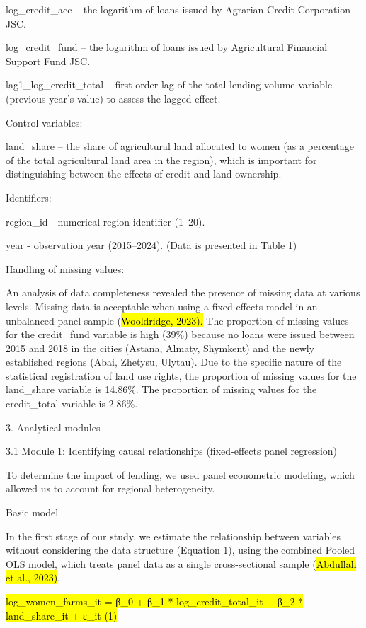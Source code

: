\documentclass[
]{article}
\begin{document}
log\_credit\_acc -- the logarithm of loans issued by Agrarian Credit
Corporation JSC.

log\_credit\_fund -- the logarithm of loans issued by Agricultural
Financial Support Fund JSC.

lag1\_log\_credit\_total -- first-order lag of the total lending volume
variable (previous year's value) to assess the lagged effect.

Control variables:

land\_share -- the share of agricultural land allocated to women (as a
percentage of the total agricultural land area in the region), which is
important for distinguishing between the effects of credit and land
ownership.

Identifiers:

region\_id - numerical region identifier (1--20).

year - observation year (2015--2024). (Data is presented in Table 1)

Handling of missing values:

An analysis of data completeness revealed the presence of missing data
at various levels. Missing data is acceptable when using a fixed-effects
model in an unbalanced panel sample (\hl{Wooldridge, 2023).} The
proportion of missing values for the credit\_fund variable is high
(39\%) because no loans were issued between 2015 and 2018 in the cities
(Astana, Almaty, Shymkent) and the newly established regions (Abai,
Zhetysu, Ulytau). Due to the specific nature of the statistical
registration of land use rights, the proportion of missing values for
the land\_share variable is 14.86\%. The proportion of missing values
for the credit\_total variable is 2.86\%.

3. Analytical modules

3.1 Module 1: Identifying causal relationships (fixed-effects panel
regression)

To determine the impact of lending, we used panel econometric modeling,
which allowed us to account for regional heterogeneity.

Basic model

In the first stage of our study, we estimate the relationship between
variables without considering the data structure (Equation 1), using the
combined Pooled OLS model, which treats panel data as a single
cross-sectional sample (\hl{Abdullah et al., 2023)}.

\hl{log\_women\_farms\_it = β\_0 + β\_1 * log\_credit\_total\_it + β\_2
* land\_share\_it + ε\_it (1)}
\end{document}
